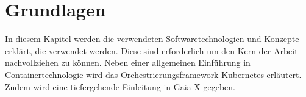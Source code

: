\chapter{Grundlagen}
\label{chap:grundlagen}

In diesem Kapitel werden die verwendeten Softwaretechnologien und Konzepte erklärt,
die verwendet werden. Diese sind erforderlich um den Kern der Arbeit nachvollziehen zu können.
Neben einer allgemeinen Einführung in Containertechnologie wird das Orchestrierungsframework Kubernetes erläutert.
Zudem wird eine tiefergehende Einleitung in Gaia-X gegeben.
